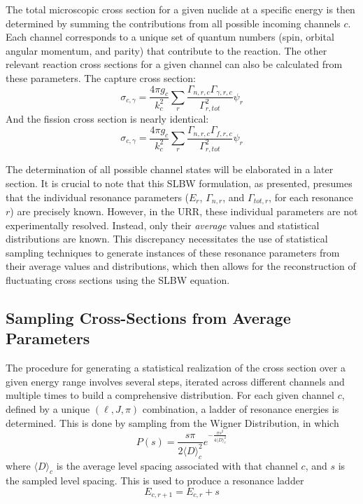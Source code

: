 The total microscopic cross section for a given nuclide at a specific energy is then determined by summing the contributions from all possible incoming channels $c$. Each channel corresponds to a unique set of quantum numbers (spin, orbital angular momentum, and parity) that contribute to the reaction. The other relevant reaction cross sections for a given channel can also be calculated from these parameters. The capture cross section:
\begin{equation}
    \sigma_{c,\gamma} =  \frac{ 4 \pi g_c}{k_c^2}  \sum_r \frac{\Gamma_{n,r,c} \Gamma_{\gamma,r,c}}{\Gamma_{r,tot}^2} \psi_r
\end{equation}
And the fission cross section is nearly identical:
\begin{equation}
    \sigma_{c,\gamma} =  \frac{ 4 \pi g_c}{k_c^2}  \sum_r \frac{\Gamma_{n,r,c} \Gamma_{f,r,c}}{\Gamma_{r,tot}^2} \psi_r
\end{equation}

The determination of all possible channel states will be elaborated in a later section. It is crucial to note that this SLBW formulation, as presented, presumes that the individual resonance parameters ($E_r$, $\Gamma_{n,r}$, and $\Gamma_{tot,r}$, for each resonance $r$) are precisely known. However, in the URR, these individual parameters are not experimentally resolved. Instead, only their \textit{average} values and statistical distributions are known. This discrepancy necessitates the use of statistical sampling techniques to generate instances of these resonance parameters from their average values and distributions, which then allows for the reconstruction of fluctuating cross sections using the SLBW equation.

\subsection{Sampling Cross-Sections from Average Parameters}
\label{sec:sampling-parameters}


The procedure for generating a statistical realization of the cross section over a given energy range involves several steps, iterated across different channels and multiple times to build a comprehensive distribution. For each given channel $c$, defined by a unique $(\ell, J, \pi)$ combination, a ladder of resonance energies is determined. This is done by sampling from the Wigner Distribution, in which
\begin{equation}
    \label{eq:wigner=distribution}
    P(s) = \frac{s\pi}{2 \langle D \rangle_c^2} e^{-\frac{\pi s^2}{4 \langle D \rangle_c^2}}
\end{equation}
where $\langle D \rangle_c$ is the average level spacing associated with that channel $c$, and $s$ is the sampled level spacing. This is used to produce a resonance ladder
\begin{equation}
    E_{c,r+1} = E_{c,r} + s
\end{equation}

